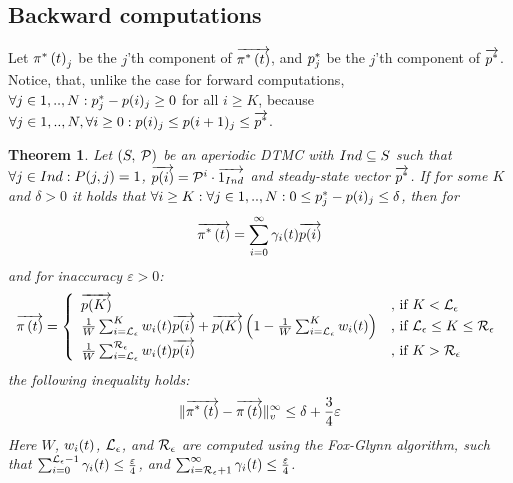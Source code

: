 \documentclass[a4paper,11pt]{article}
\newcommand{\SubSection}[1]{\subsection{#1}}
\newtheorem{theorem}{Theorem}
\begin{document}
		\SubSection{Backward computations \label{ss:error_backward}}
		
		Let $\pi^{*} \left( t \right)_{j}$ be the $j$'th component of $\overrightarrow{\pi^{*} \left( t \right)}$, and $p^{*}_{j}$ be the $j$'th component of $\overrightarrow{p^{*}}$.  Notice, that, unlike the case for forward computations, $\forall j \in 1,..,N : p^{*}_{j} - p(i)_{j} \geq 0$ for all $i \geq K$, because $\forall j \in 1,..,N, \forall i\geq0 : p(i)_{j} \leq p(i+1)_{j} \leq \overrightarrow{p^{*}}$.
		
		\begin{theorem}
			Let $\left( S,\: \mathcal{P} \right)$ be an aperiodic DTMC with $Ind \subseteq S$ such that $\forall j \in Ind : P(j,j) = 1$, $\overrightarrow{p(i)}=\mathcal{P}^{i} \cdot \overrightarrow{1_{Ind}}$ and steady-state vector $\overrightarrow{p^{*}}$. If for some $K$ and $\delta > 0$ it holds that $\forall i \geq K : \forall j \in 1,..,N : 0 \leq p^{*}_{j} - p(i)_{j} \leq \delta$, then for 
			\begin{equation}
				\overrightarrow{\pi^{*} \left( t \right)} = \sum_{i=0}^{\infty}\gamma_{i}(t) \overrightarrow{p(i)} \nonumber
			\end{equation}
			and for inaccuracy $\varepsilon > 0$:
			\begin{equation}
				\displaystyle
				\overrightarrow{\pi \left( t \right) } = \left\{
				\begin{array}{ll}
					\overrightarrow{p(K)} & \text{, if } K < \mathcal{L}_{\epsilon}\\
					\frac{1}{W} \sum_{i=\mathcal{L}_{\epsilon}}^{K}w_{i}(t) \overrightarrow{p(i)} + \overrightarrow{p(K)} \left(1- \frac{1}{W} \sum_{i=\mathcal{L}_{\epsilon}}^{K}w_{i}(t) \right) & \text{, if } \mathcal{L}_{\epsilon} \leq K \leq \mathcal{R}_{\epsilon}\\
					\frac{1}{W} \sum_{i=\mathcal{L}_{\epsilon}}^{\mathcal{R}_{\epsilon}}w_{i}(t) \overrightarrow{p(i)} & \text{, if } K > \mathcal{R}_{\epsilon}\\
				\end{array}
				\right .
				\nonumber
			\end{equation}
			the following inequality holds:
			\begin{equation}
				\lVert   \overrightarrow{\pi^{*} \left( t \right)} - \overrightarrow{\pi \left( t \right) }   \rVert_{v}^{\infty} \leq \delta + \frac{3}{4} \varepsilon \nonumber
			\end{equation}
			Here $W$, $w_{i}(t)$, $\mathcal{L}_{\epsilon}$, and $\mathcal{R}_{\epsilon}$ are computed using the Fox-Glynn algorithm, such that $\sum_{i=0}^{\mathcal{L}_{\epsilon}-1} \gamma_{i}(t) \leq \frac{\varepsilon}{4}$, and $\sum_{i=\mathcal{R}_{\epsilon}+1}^{\infty} \gamma_{i}(t) \leq \frac{\varepsilon}{4}$.
			\label{th:error_bwd}
		\end{theorem}
\end{document}
